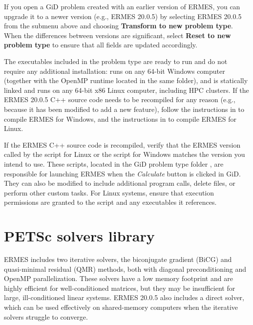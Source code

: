If you open a GiD problem created with an earlier version of ERMES, you can upgrade it to a newer version (e.g., ERMES 20.0.5) by selecting ERMES 20.0.5 from the submenu above and choosing \textbf{Transform to new problem type}. When the differences between versions are significant, select \textbf{Reset to new problem type} to ensure that all fields are updated accordingly.

The executables included in the problem type are ready to run and do not require any additional installation:  runs on any 64-bit Windows computer (together with the OpenMP runtime  located in the same folder), and  is statically linked and runs on any 64-bit x86 Linux computer, including HPC clusters. If the ERMES 20.0.5 C++ source code needs to be recompiled for any reason (e.g., because it has been modified to add a new feature), follow the instructions in  to compile ERMES for Windows, and the instructions in  to compile ERMES for Linux.

If the ERMES C++ source code is recompiled, verify that the ERMES version called by the  script for Linux or the  script for Windows matches the version you intend to use. These scripts, located in the GiD problem type folder , are responsible for launching ERMES when the \textit{Calculate} button is clicked in GiD. They can also be modified to include additional program calls, delete files, or perform other custom tasks. For Linux systems, ensure that execution permissions are granted to the script  and any executables it references. 

\section{PETSc solvers library}\label{ExternalSolversInstall}

ERMES includes two iterative solvers, the biconjugate gradient (BiCG) and quasi-minimal residual (QMR) methods, both with diagonal preconditioning and OpenMP parallelization. These solvers have a low memory footprint and are highly efficient for well-conditioned matrices, but they may be insufficient for large, ill-conditioned linear systems. ERMES 20.0.5 also includes a direct solver, which can be used effectively on shared-memory computers when the iterative solvers struggle to converge.

